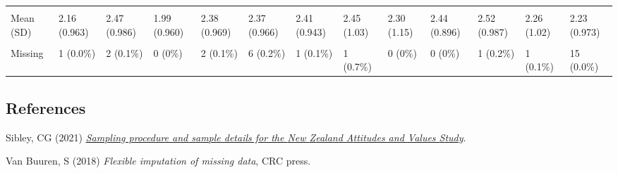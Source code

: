 \documentclass[
  single column]{article}
\newlength{\cslhangindent}
\newenvironment{CSLReferences}[2] %
 {\begin{list}{}{%
  \setlength{\itemindent}{0pt}
  \setlength{\leftmargin}{0pt}
  \setlength{\parsep}{0pt}
  \ifodd #1
   \setlength{\leftmargin}{\cslhangindent}
   \setlength{\itemindent}{-1\cslhangindent}
  \fi
  \setlength{\itemsep}{#2\baselineskip}}}
 {\end{list}}
\begin{document}
\begin{landscape}
\begin{longtable}[t]{lllllllllllll}
\cellcolor{gray!10}{Social Dominance Orientation} & \cellcolor{gray!10}{} & \cellcolor{gray!10}{} & \cellcolor{gray!10}{} & \cellcolor{gray!10}{} & \cellcolor{gray!10}{} & \cellcolor{gray!10}{} & \cellcolor{gray!10}{} & \cellcolor{gray!10}{} & \cellcolor{gray!10}{} & \cellcolor{gray!10}{} & \cellcolor{gray!10}{} & \cellcolor{gray!10}{}\\
\addlinespace
Mean (SD) & 2.16 (0.963) & 2.47 (0.986) & 1.99 (0.960) & 2.38 (0.969) & 2.37 (0.966) & 2.41 (0.943) & 2.45 (1.03) & 2.30 (1.15) & 2.44 (0.896) & 2.52 (0.987) & 2.26 (1.02) & 2.23 (0.973)\\
\cellcolor{gray!10}{Median [Min, Max]} & \cellcolor{gray!10}{2.00 [1.00, 7.00]} & \cellcolor{gray!10}{2.33 [1.00, 6.33]} & \cellcolor{gray!10}{1.80 [1.00, 5.67]} & \cellcolor{gray!10}{2.33 [1.00, 6.00]} & \cellcolor{gray!10}{2.33 [1.00, 7.00]} & \cellcolor{gray!10}{2.33 [1.00, 5.67]} & \cellcolor{gray!10}{2.33 [1.00, 6.80]} & \cellcolor{gray!10}{2.00 [1.00, 5.67]} & \cellcolor{gray!10}{2.33 [1.00, 5.33]} & \cellcolor{gray!10}{2.50 [1.00, 6.67]} & \cellcolor{gray!10}{2.17 [1.00, 7.00]} & \cellcolor{gray!10}{2.17 [1.00, 7.00]}\\
Missing & 1 (0.0\%) & 2 (0.1\%) & 0 (0\%) & 2 (0.1\%) & 6 (0.2\%) & 1 (0.1\%) & 1 (0.7\%) & 0 (0\%) & 0 (0\%) & 1 (0.2\%) & 1 (0.1\%) & 15 (0.0\%)\\*

\end{longtable}

\endgroup{}


\end{landscape}

\newpage{}

\subsection*{References}\label{references}

\label{refs}
\begin{CSLReferences}{1}{0}
Sibley, CG (2021)
\emph{\href{https://doi.org/10.31234/osf.io/wgqvy}{Sampling procedure
and sample details for the {N}ew {Z}ealand {A}ttitudes and {V}alues
{S}tudy}}.

Van Buuren, S (2018) \emph{Flexible imputation of missing data}, CRC
press.

\end{CSLReferences}
\end{document}
